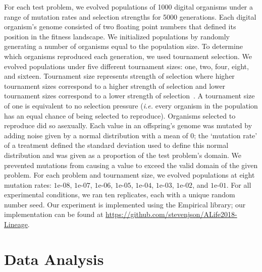 \documentclass[letterpaper]{article}
\begin{document}
For each test problem, we evolved populations of 1000 digital organisms under a range of mutation rates and selection strengths for 5000 generations. Each digital organism's genome consisted of two floating point numbers that defined its position in the fitness landscape. 
We initialized populations by randomly generating a number of organisms equal to the population size. 
To determine which organisms reproduced each generation, we used tournament selection. We evolved populations under five different tournament sizes: one, two, four, eight, and sixteen.  Tournament size represents strength of selection where higher tournament sizes correspond to a higher strength of selection and lower tournament sizes correspond to a lower strength of selection~\citep{blickle1995mathematical}.
A tournament size of one is equivalent to no selection pressure (\textit{i.e.} every organism in the population has an equal chance of being selected to reproduce). Organisms selected to reproduce did so asexually. Each value in an offspring's genome was mutated by adding noise given by a normal distribution with a mean of 0; the `mutation rate' of a treatment defined the standard deviation used to define this normal distribution and was given as a proportion of the test problem's domain. 
We prevented mutations from causing a value to exceed the valid domain of the given problem. 
For each problem and tournament size, we evolved populations at eight mutation rates: $1\text{e-}08$, $1\text{e-}07$, $1\text{e-}06$, $1\text{e-}05$, $1\text{e-}04$, $1\text{e-}03$, $1\text{e-}02$, and $1\text{e-}01$. 
For all experimental conditions, we ran ten replicates, each with a unique random number seed. 
Our experiment is implemented using the Empirical library; our implementation can be found at \url{https://github.com/stevenjson/ALife2018-Lineage}. %


\section{Data Analysis}
\end{document}
